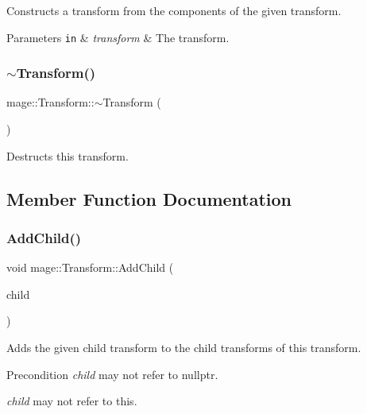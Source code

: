 Constructs a transform from the components of the given transform.


\begin{DoxyParams}[1]{Parameters}
\mbox{\tt in}  & {\em transform} & The transform. \\
\hline
\end{DoxyParams}
\hypertarget{structmage_1_1_transform_a3380713ee853d112c140e8688c0f73b5}{}\label{structmage_1_1_transform_a3380713ee853d112c140e8688c0f73b5} 
\subsubsection{\texorpdfstring{$\sim$\+Transform()}{~Transform()}}
{\footnotesize\ttfamily mage\+::\+Transform\+::$\sim$\+Transform (\begin{DoxyParamCaption}{ }\end{DoxyParamCaption})}

Destructs this transform. 

\subsection{Member Function Documentation}
\hypertarget{structmage_1_1_transform_ac9fb285f730207740114b61bdb010bf9}{}\label{structmage_1_1_transform_ac9fb285f730207740114b61bdb010bf9} 
\subsubsection{\texorpdfstring{Add\+Child()}{AddChild()}}
{\footnotesize\ttfamily void mage\+::\+Transform\+::\+Add\+Child (\begin{DoxyParamCaption}\item[{\hyperlink{namespacemage_a1e01ae66713838a7a67d30e44c67703e}{Shared\+Ptr}$<$ \hyperlink{structmage_1_1_transform}{Transform} $>$}]{child }\end{DoxyParamCaption})}

Adds the given child transform to the child transforms of this transform.

\begin{DoxyPrecond}{Precondition}
{\itshape child} may not refer to {\ttfamily nullptr}. 

{\itshape child} may not refer to {\ttfamily this}. 
\end{DoxyPrecond}

